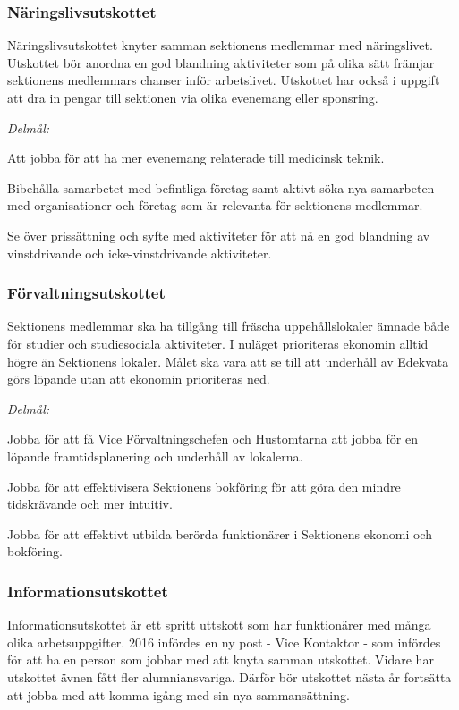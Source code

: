 \documentclass[../_main/handlingar.tex]{subfiles}
\begin{document}
\subsubsection*{Näringslivsutskottet}
Näringslivsutskottet knyter samman sektionens medlemmar med näringslivet. Utskottet bör anordna en god blandning aktiviteter som på olika sätt främjar sektionens medlemmars chanser inför arbetslivet. Utskottet har också i uppgift att dra in pengar till sektionen via olika evenemang eller sponsring.

\emph{Delmål:}
\begin{dashlist}
    \item Att jobba för att ha mer evenemang relaterade till medicinsk teknik.
    \item Bibehålla samarbetet med befintliga företag samt aktivt söka nya samarbeten med organisationer och företag som är relevanta för sektionens medlemmar.
    \item Se över prissättning och syfte med aktiviteter för att nå en god blandning av vinstdrivande och icke-vinstdrivande aktiviteter.
\end{dashlist}

\subsubsection*{Förvaltningsutskottet}
Sektionens medlemmar ska ha tillgång till fräscha uppehållslokaler ämnade både för studier och studiesociala aktiviteter. I nuläget prioriteras ekonomin alltid högre än Sektionens lokaler. Målet ska vara att se till att underhåll av Edekvata görs löpande utan att ekonomin prioriteras ned.

\emph{Delmål:}
\begin{dashlist}
    \item Jobba för att få Vice Förvaltningschefen och Hustomtarna att jobba för en löpande framtidsplanering och underhåll av lokalerna.
    \item Jobba för att effektivisera Sektionens bokföring för att göra den mindre tidskrävande och mer intuitiv.
    \item Jobba för att effektivt utbilda berörda funktionärer i Sektionens ekonomi och bokföring.
\end{dashlist}

\newpage

\subsubsection*{Informationsutskottet}
Informationsutskottet är ett spritt uttskott som har funktionärer med många olika arbetsuppgifter. 2016 infördes en ny post - Vice Kontaktor - som infördes för att ha en person som jobbar med att knyta samman utskottet. Vidare har utskottet ävnen fått fler alumniansvariga. Därför bör utskottet nästa år fortsätta att jobba med att komma igång med sin nya sammansättning.
\end{document}
